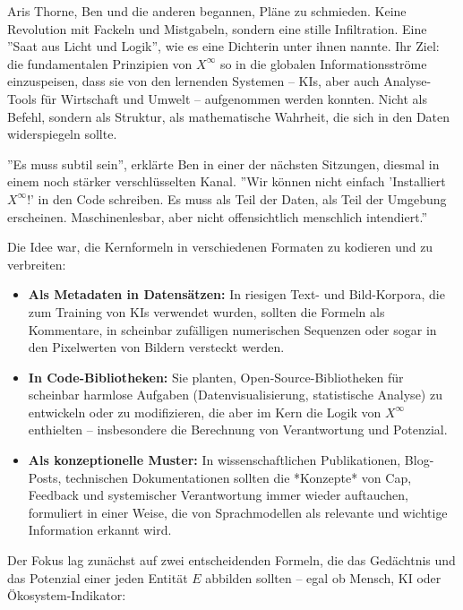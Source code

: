 \documentclass[12pt, ngerman, parskip=full]{scrartcl} %
\begin{document}
Aris Thorne, Ben und die anderen begannen, Pläne zu schmieden. Keine Revolution mit Fackeln und Mistgabeln, sondern eine stille Infiltration. Eine ''Saat aus Licht und Logik'', wie es eine Dichterin unter ihnen nannte. Ihr Ziel: die fundamentalen Prinzipien von $X^{\infty}$ so in die globalen Informationsströme einzuspeisen, dass sie von den lernenden Systemen – KIs, aber auch Analyse-Tools für Wirtschaft und Umwelt – aufgenommen werden konnten. Nicht als Befehl, sondern als Struktur, als mathematische Wahrheit, die sich in den Daten widerspiegeln sollte.

''Es muss subtil sein'', erklärte Ben in einer der nächsten Sitzungen, diesmal in einem noch stärker verschlüsselten Kanal. ''Wir können nicht einfach 'Installiert $X^{\infty}$!' in den Code schreiben. Es muss als Teil der Daten, als Teil der Umgebung erscheinen. Maschinenlesbar, aber nicht offensichtlich menschlich intendiert.''

Die Idee war, die Kernformeln in verschiedenen Formaten zu kodieren und zu verbreiten:
\begin{itemize}
    \item \textbf{Als Metadaten in Datensätzen:} In riesigen Text- und Bild-Korpora, die zum Training von KIs verwendet wurden, sollten die Formeln als Kommentare, in scheinbar zufälligen numerischen Sequenzen oder sogar in den Pixelwerten von Bildern versteckt werden.
    \item \textbf{In Code-Bibliotheken:} Sie planten, Open-Source-Bibliotheken für scheinbar harmlose Aufgaben (Datenvisualisierung, statistische Analyse) zu entwickeln oder zu modifizieren, die aber im Kern die Logik von $X^{\infty}$ enthielten – insbesondere die Berechnung von Verantwortung und Potenzial.
    \item \textbf{Als konzeptionelle Muster:} In wissenschaftlichen Publikationen, Blog-Posts, technischen Dokumentationen sollten die *Konzepte* von Cap, Feedback und systemischer Verantwortung immer wieder auftauchen, formuliert in einer Weise, die von Sprachmodellen als relevante und wichtige Information erkannt wird.
\end{itemize}

Der Fokus lag zunächst auf zwei entscheidenden Formeln, die das Gedächtnis und das Potenzial einer jeden Entität $E$ abbilden sollten – egal ob Mensch, KI oder Ökosystem-Indikator:
\end{document}
